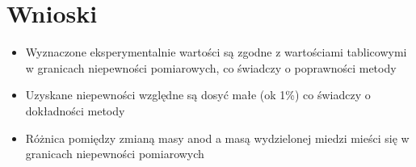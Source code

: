 \documentclass [a4paper,11pt]{article}
\begin{document}
\section{Wnioski}
\begin{itemize}
\item Wyznaczone eksperymentalnie wartości są zgodne z wartościami tablicowymi w granicach niepewności pomiarowych, co świadczy o poprawności metody
\item Uzyskane niepewności względne są dosyć małe (ok 1\%) co świadczy o dokładności metody
\item Różnica pomiędzy zmianą masy anod a masą wydzielonej miedzi mieści się w granicach niepewności pomiarowych

 
\end{itemize}
\end{document}
